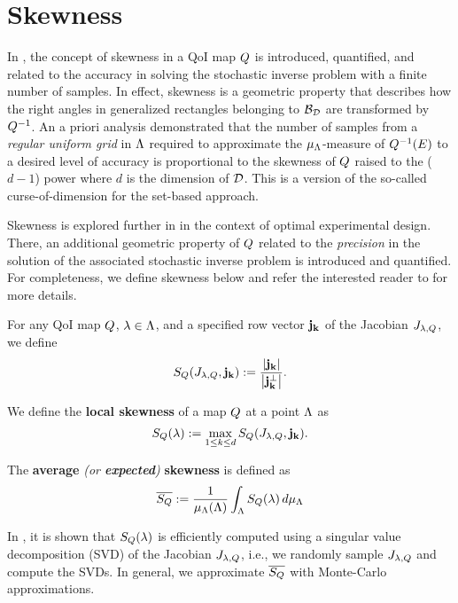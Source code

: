 \section{Skewness}\label{sec:skewness}
In \cite{BGE+15}, the concept of skewness in a QoI map $Q$ is introduced, quantified, and related to the accuracy in solving the stochastic inverse problem with a finite number of samples.
In effect, skewness is a geometric property that describes how the right angles in generalized rectangles belonging to $\mathcal{B}_{\mathcal{D}}$ are transformed by $Q^{-1}$.
An a priori analysis demonstrated that the number of samples from a {\em regular uniform grid} in ${\Lambda}$ required to approximate the $\mu_{{\Lambda}}$-measure of $Q^{-1}(E)$ to a desired level of accuracy is proportional to the skewness of $Q$ raised to the ($d-1$) power where $d$ is the dimension of $\mathcal{D}$.
This is a version of the so-called curse-of-dimension for the set-based approach.

Skewness is explored further in \cite{Walsh} in the context of optimal experimental design.
There, an additional geometric property of $Q$ related to the \emph{precision} in the solution of the associated stochastic inverse problem is introduced and quantified.
For completeness, we define skewness below and refer the interested reader to \cite{BGE+15, BPW17, Walsh} for more details.

\begin{defn}
For any QoI map $Q$, $\lambda \in {\Lambda}$, and a specified row vector $\bf{j}_k$ of the Jacobian $J_{\lambda, Q}$, we define
\begin{equation}
S_Q(J_{\lambda,Q}, \bf{j}_k) := \frac{\left\vert\bf{j}_k\right\vert }{\left\vert\bf{j}_k^\perp\right\vert}.
\label{eq:skewness}
\end{equation}

We define the \textbf{local skewness} of a map $Q$ at a point ${\Lambda}$ as
\begin{equation}
S_Q(\lambda) := \max_{1\leq k \leq d} S_Q(J_{\lambda,Q}, \bf{j}_k).
\label{eq:localskewness}
\end{equation}
\end{defn}

\begin{defn}
The \textbf{average} \emph{(or \textbf{expected})} \textbf{skewness} is defined as
\begin{equation}
\overline{S_Q} := \frac{1}{\mu_{{\Lambda}}({\Lambda})} \int_{\Lambda} S_Q (\lambda) \, d\mu_{{\Lambda}}
\label{eq:avgskew}
\end{equation}
\end{defn}

In \cite{BPW17}, it is shown that $S_Q(\lambda)$ is efficiently computed using a singular value decomposition (SVD) of the Jacobian $J_{\lambda,Q}$, i.e., we randomly sample $J_{\lambda,Q}$ and compute the SVDs.
In general, we approximate $\overline{S_Q}$ with Monte-Carlo approximations.
